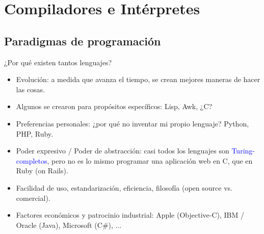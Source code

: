 \documentclass{beamer} %
\newcommand{\blue}[1]{\textcolor{blue}{#1}}
\begin{document}
\section{Compiladores e Intérpretes}
\subsection{Paradigmas de programación}

\begin{frame}{¿Por qué existen tantos lenguajes?}
  \begin{itemize}
    \item<1-> Evolución: a medida que avanza el tiempo, se crean mejores maneras de hacer las cosas.
    \item<2-> Algunos se crearon para propósitos específicos: Lisp, Awk, ¿C?
    \item<3-> Preferencias personales: ¿por qué no inventar mi propio lenguaje? Python, PHP, Ruby.
    \item<4-> Poder expresivo / Poder de abstracción: casi todos los lenguajes son \blue{Turing-completos}, pero no es lo mismo programar una aplicación web en C, que en Ruby (on Rails).
    \item<5-> Facilidad de uso, estandarización, eficiencia, filosofía (open source vs. comercial).
    \item<6-> Factores económicos y patrocinio industrial: Apple (Objective-C), IBM / Oracle (Java), Microsoft (C\#), ...
  \end{itemize}
\end{frame}
\end{document}
